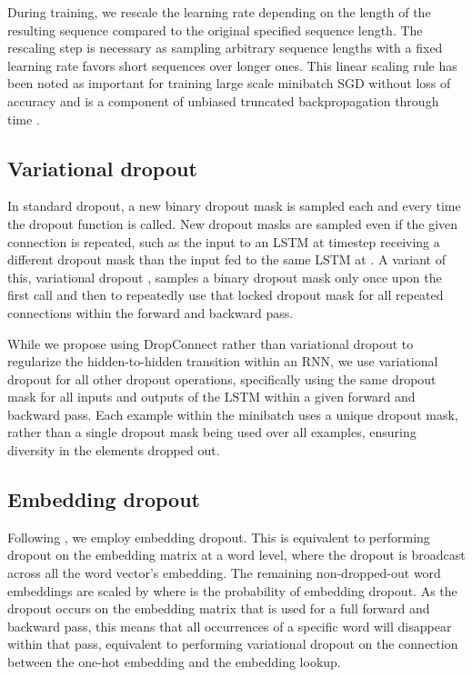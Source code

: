 \documentclass{article}
\begin{document}
During training, we rescale the learning rate depending on the length of the resulting sequence compared to the original specified sequence length.
The rescaling step is necessary as sampling arbitrary sequence lengths with a fixed learning rate favors short sequences over longer ones.
This linear scaling rule has been noted as important for training large scale minibatch SGD without loss of accuracy \citep{Goyal2017} and is a component of unbiased truncated backpropagation through time \citep{Tallec2017}.

\subsection{Variational dropout}
In standard dropout, a new binary dropout mask is sampled each and every time the dropout function is called.
New dropout masks are sampled even if the given connection is repeated, such as the input  to an LSTM at timestep  receiving a different dropout mask than the input  fed to the same LSTM at .
A variant of this, variational dropout \cite{Gal2016ATG}, samples a binary dropout mask only once upon the first call and then to repeatedly use that locked dropout mask for all repeated connections within the forward and backward pass.

While we propose using DropConnect rather than variational dropout to regularize the hidden-to-hidden transition within an RNN, we use variational dropout for all other dropout operations, specifically using the same dropout mask for all inputs and outputs of the LSTM within a given forward and backward pass.
Each example within the minibatch uses a unique dropout mask, rather than a single dropout mask being used over all examples, ensuring diversity in the elements dropped out.

\subsection{Embedding dropout}

Following \citet{Gal2016ATG}, we employ embedding dropout.
This is equivalent to performing dropout on the embedding matrix at a word level, where the dropout is broadcast across all the word vector's embedding.
The remaining non-dropped-out word embeddings are scaled by  where  is the probability of embedding dropout.
As the dropout occurs on the embedding matrix that is used for a full forward and backward pass, this means that all occurrences of a specific word will disappear within that pass, equivalent to performing variational dropout on the connection between the one-hot embedding and the embedding lookup.
\end{document}
